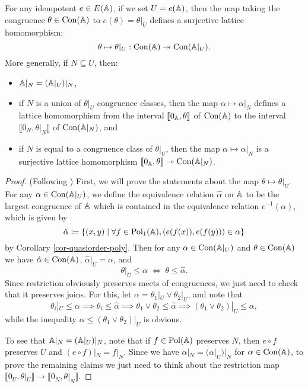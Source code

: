 \begin{appendices}
\begin{lem}\label{lem-idempotent-surjective-lattice} For any idempotent $e \in E(\mathbb{A})$, if we set $U = e(\mathbb{A})$, then the map taking the congruence $\theta \in \operatorname{Con}(\mathbb{A})$ to $e(\theta) = \theta|_U$ defines a surjective lattice homomorphism:
\[
\theta \mapsto \theta|_U : \operatorname{Con}(\mathbb{A}) \twoheadrightarrow \operatorname{Con}(\mathbb{A}|_U).
\]
More generally, if $N \subseteq U$, then:
\begin{itemize}
\item $\mathbb{A}|_N = (\mathbb{A}|_U)|_N$,
\item if $N$ is a union of $\theta|_U$ congruence classes, then the map $\alpha \mapsto \alpha|_N$ defines a lattice homomorphism from the interval $\llbracket 0_{\mathbb{A}}, \theta \rrbracket$ of $\operatorname{Con}(\mathbb{A})$ to the interval $\llbracket 0_N, \theta|_N \rrbracket$ of $\operatorname{Con}(\mathbb{A}|_N)$, and
\item if $N$ is equal to a congruence class of $\theta|_U$, then the map $\alpha \mapsto \alpha|_N$ is a surjective lattice homomorphism $\llbracket 0_{\mathbb{A}}, \theta \rrbracket \twoheadrightarrow \operatorname{Con}(\mathbb{A}|_N)$.
\end{itemize}
\end{lem}
\begin{proof} (Following \cite{hobby-mckenzie}) First, we will prove the statements about the map $\theta \mapsto \theta|_U$. For any $\alpha \in \operatorname{Con}(\mathbb{A}|_U)$, we define the equivalence relation $\hat{\alpha}$ on $\mathbb{A}$ to be the largest congruence of $\mathbb{A}$ which is contained in the equivalence relation $e^{-1}(\alpha)$, which is given by
\[
\hat{\alpha} \coloneqq \{(x,y) \mid \forall f \in \operatorname{Pol}_1(\mathbb{A}), (e(f(x)), e(f(y))) \in \alpha\}
\]
by Corollary \ref{cor-quasiorder-poly}. Then for any $\alpha \in \operatorname{Con}(\mathbb{A}|_U)$ and $\theta \in \operatorname{Con}(\mathbb{A})$ we have $\hat{\alpha} \in \operatorname{Con}(\mathbb{A})$, $\hat{\alpha}|_U = \alpha$, and
\[
\theta|_U \le \alpha \; \iff \; \theta \le \hat{\alpha}.
\]
Since restriction obviously preserves meets of congruences, we just need to check that it preserves joins. For this, let $\alpha = \theta_1|_U \vee \theta_2|_U$, and note that
\[
\theta_i|_U \le \alpha \implies \theta_i \le \hat{\alpha} \implies \theta_1 \vee \theta_2 \le \hat{\alpha} \implies (\theta_1\vee\theta_2)|_U \le \alpha,
\]
while the inequality $\alpha \le (\theta_1\vee\theta_2)|_U$ is obvious.

To see that $\mathbb{A}|_N = (\mathbb{A}|_U)|_N$, note that if $f \in \operatorname{Pol}(\mathbb{A})$ preserves $N$, then $e\circ f$ preserves $U$ and $(e \circ f)|_N = f|_N$. Since we have $\alpha|_N = (\alpha|_U)|_N$ for $\alpha \in \operatorname{Con}(\mathbb{A})$, to prove the remaining claims we just need to think about the restriction map $\llbracket 0_U, \theta|_U \rrbracket \rightarrow \llbracket 0_N, \theta|_N \rrbracket$.


\end{proof}
\end{appendices}
